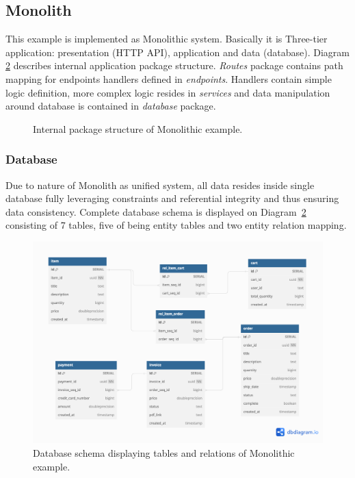 \subsection{Monolith}
This example is implemented as Monolithic system. Basically it is Three-tier application: presentation (HTTP API), application and data (database). Diagram \ref{img:monolith_db_schema} describes internal application package structure. \textit{Routes} package contains path mapping for endpoints handlers defined in \textit{endpoints}. Handlers contain simple logic definition, more complex logic resides in \textit{services} and data manipulation around database is contained in \textit{database} package.

\begin{figure}
    \centering
    
    \caption{Internal package structure of Monolithic example. \label{img:monolith_package}}
\end{figure}


\subsubsection{Database}
Due to nature of Monolith as unified system, all data resides inside single database fully leveraging constraints and referential integrity and thus ensuring data consistency. Complete database schema is displayed on Diagram~\ref{img:monolith_db_schema} consisting of 7 tables, five of being entity tables and two entity relation mapping.

\begin{figure}
    \centering
    \includegraphics[width=\textwidth]{images/monolith_db_schema.png}
    \caption{Database schema displaying tables and relations of Monolithic example. \label{img:monolith_db_schema}}
\end{figure}



